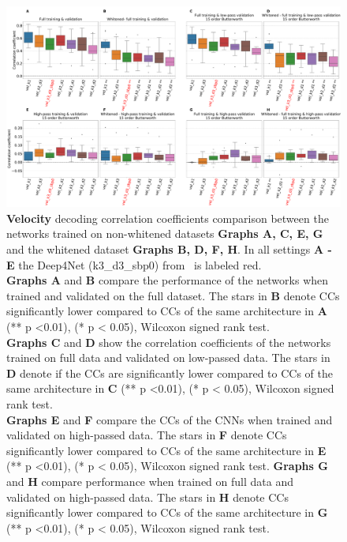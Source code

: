 \begin{figure}[!htbp]
   \includegraphics[width=1\linewidth]{img/ch4/vel-pw-vs-non-pw-performance}
   \caption{\textbf{Velocity} decoding correlation coefficients comparison between the networks trained on non-whitened datasets \textbf{Graphs A, C, E, G} and the whitened dataset \textbf{Graphs B, D, F, H}.
   In all settings \textbf{A - E} the Deep4Net (k3\_d3\_sbp0) from~\cite{Hammer-2021} is labeled red.
   \\ \textbf{Graphs A} and \textbf{B} compare the performance of the networks when trained and validated on the full dataset.
   The stars in \textbf{B} denote CCs significantly lower compared to CCs of the same architecture in \textbf{A} (** p <0.01), (* p < 0.05), Wilcoxon signed rank test.
   \\\textbf{Graphs C} and \textbf{D} show the correlation coefficients of the networks trained on full data and validated on low-passed data.
   The stars in \textbf{D} denote if the CCs are significantly lower compared to CCs of the same architecture in \textbf{C} (** p <0.01), (* p < 0.05), Wilcoxon signed rank test.
   \\\textbf{Graphs E} and \textbf{F} compare the CCs of the CNNs when trained and validated on high-passed data.
   The stars in \textbf{F} denote CCs significantly lower compared to CCs of the same architecture in \textbf{E} (** p <0.01), (* p < 0.05), Wilcoxon signed rank test.
   \textbf{Graphs G} and \textbf{H} compare performance when trained on full data and validated on high-passed data.
   The stars in \textbf{H} denote CCs significantly lower compared to CCs of the same architecture in \textbf{G} (** p <0.01), (* p < 0.05), Wilcoxon signed rank test.}
   \label{fig:vel-pw-performance}
\end{figure}

